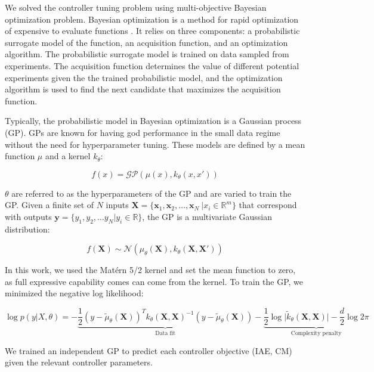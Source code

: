 We solved the controller tuning problem using multi-objective Bayesian optimization problem. Bayesian optimization is a method for rapid optimization of expensive to evaluate functions \citep{Shahriari2016}. It relies on three components: a probabilistic surrogate model of the function, an acquisition function, and an optimization algorithm.  The probabilistic surrogate model is trained on data sampled from experiments. The acquisition function determines the value of different potential experiments given the the trained probabilistic model, and the optimization algorithm is used to find the next candidate that maximizes the acquisition function.

Typically, the probabilistic model in Bayesian optimization is a Gaussian process (GP). GPs are known for having god performance in the small data regime without the need for hyperparameter tuning. These models are defined by a mean function $\mu$ and a kernel $k_{\theta}$:

\begin{equation}
    f(x)= \mathcal{GP}(\mu(x), k_{\theta}(x, x'))
\end{equation}

$\theta$ are referred to as the hyperparameters of the GP and are varied to train the GP. Given a finite set of $N$ inputs $\mathbf X = \{\mathbf x_1, \mathbf x_2, \dots, \mathbf x_N \ \vert x_i \in \mathbb R^m \}$ that correspond with outputs $\mathbf y = \{y_1, y_2, \dots y_N \vert  y_i \in \mathbb R \}$, the GP is a multivariate Gaussian distribution:

\begin{equation}
    f(\mathbf X) \sim \mathcal N(\mu_{\theta}(\mathbf X), k_{\theta}(\mathbf X, \mathbf X'))
\end{equation}

In this work, we used the Matérn 5/2 kernel and set the mean function to zero, as full expressive capability comes can come from the kernel. To train the GP, we minimized the negative log likelihood:

\begin{equation}
    \log p(y \vert X, \theta) = -\underbrace{\frac{1}{2}(y-\tilde \mu_{\theta}(\mathbf X))^T k_{\theta}(\mathbf X, \mathbf X)^{-1}(y- \tilde\mu_{\theta}(\mathbf X)) }_{\text{Data  fit}}- \underbrace{\frac{1}{2} \log{\vert \tilde k_{\theta}(\mathbf X, \mathbf X) \vert} - \frac{d}{2}\log{2 \pi}}_{\text{Complexity penalty}}
\end{equation}

We trained an independent GP to predict each controller objective (IAE, CM) given the relevant controller parameters.  

